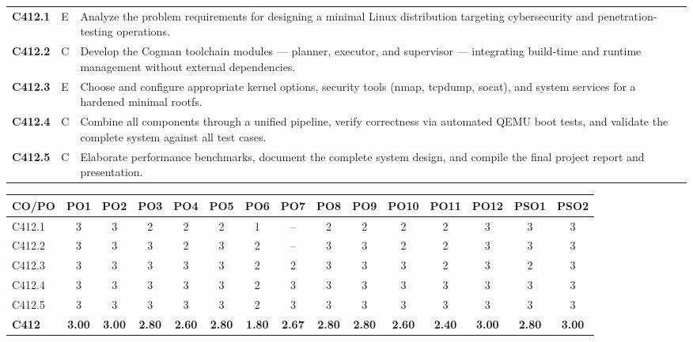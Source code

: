 \documentclass[12pt,a4paper]{report}
\begin{document}
{\fontsize{11}{14}\selectfont
\renewcommand{\arraystretch}{1.3}
\noindent\begin{tabular}{@{}p{0.10\textwidth}p{0.04\textwidth}p{0.81\textwidth}@{}}
\textbf{C412.1} & E & Analyze the problem requirements for designing a minimal Linux distribution targeting cybersecurity and penetration-testing operations. \\[3pt]
\textbf{C412.2} & C & Develop the Cogman toolchain modules --- planner, executor, and supervisor --- integrating build-time and runtime management without external dependencies. \\[3pt]
\textbf{C412.3} & E & Choose and configure appropriate kernel options, security tools (nmap, tcpdump, socat), and system services for a hardened minimal rootfs. \\[3pt]
\textbf{C412.4} & C & Combine all components through a unified pipeline, verify correctness via automated QEMU boot tests, and validate the complete system against all test cases. \\[3pt]
\textbf{C412.5} & C & Elaborate performance benchmarks, document the complete system design, and compile the final project report and presentation. \\
\end{tabular}
}

\vspace{20pt}

\begin{center}
{\fontsize{11}{14}\selectfont
\renewcommand{\arraystretch}{1.3}
\setlength{\tabcolsep}{3pt}
\begin{adjustbox}{max width=\linewidth}
\begin{tabular}{|l|c|c|c|c|c|c|c|c|c|c|c|c|c|c|}
\hline
\textbf{CO/PO} & \textbf{PO1} & \textbf{PO2} & \textbf{PO3} & \textbf{PO4} & \textbf{PO5} & \textbf{PO6} & \textbf{PO7} & \textbf{PO8} & \textbf{PO9} & \textbf{PO10} & \textbf{PO11} & \textbf{PO12} & \textbf{PSO1} & \textbf{PSO2} \\
\hline
C412.1 & 3 & 3 & 2 & 2 & 2 & 1 & -- & 2 & 2 & 2 & 2 & 3 & 3 & 3 \\
\hline
C412.2 & 3 & 3 & 3 & 2 & 3 & 2 & -- & 3 & 3 & 2 & 2 & 3 & 3 & 3 \\
\hline
C412.3 & 3 & 3 & 3 & 3 & 3 & 2 & 2 & 3 & 3 & 3 & 2 & 3 & 2 & 3 \\
\hline
C412.4 & 3 & 3 & 3 & 3 & 3 & 2 & 3 & 3 & 3 & 3 & 3 & 3 & 3 & 3 \\
\hline
C412.5 & 3 & 3 & 3 & 3 & 3 & 2 & 3 & 3 & 3 & 3 & 3 & 3 & 3 & 3 \\
\hline
\textbf{C412} & \textbf{3.00} & \textbf{3.00} & \textbf{2.80} & \textbf{2.60} & \textbf{2.80} & \textbf{1.80} & \textbf{2.67} & \textbf{2.80} & \textbf{2.80} & \textbf{2.60} & \textbf{2.40} & \textbf{3.00} & \textbf{2.80} & \textbf{3.00} \\
\hline
\end{tabular}
\end{adjustbox}
}
\end{center}

\vspace*{\fill}
\end{document}
